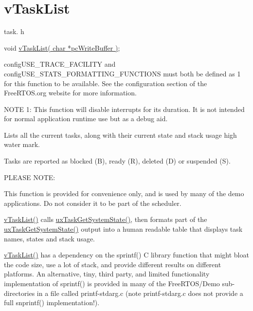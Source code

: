 \hypertarget{group__v_task_list}{}\section{v\+Task\+List}
\label{group__v_task_list}
task. h 
\begin{DoxyPre}void \hyperlink{task_8h_ab87abc717f34ddced76802d12588a93d}{vTaskList( char *pcWriteBuffer )};\end{DoxyPre}


config\+U\+S\+E\+\_\+\+T\+R\+A\+C\+E\+\_\+\+F\+A\+C\+I\+L\+I\+TY and config\+U\+S\+E\+\_\+\+S\+T\+A\+T\+S\+\_\+\+F\+O\+R\+M\+A\+T\+T\+I\+N\+G\+\_\+\+F\+U\+N\+C\+T\+I\+O\+NS must both be defined as 1 for this function to be available. See the configuration section of the Free\+R\+T\+O\+S.\+org website for more information.

N\+O\+TE 1\+: This function will disable interrupts for its duration. It is not intended for normal application runtime use but as a debug aid.

Lists all the current tasks, along with their current state and stack usage high water mark.

Tasks are reported as blocked (\textquotesingle{}B\textquotesingle{}), ready (\textquotesingle{}R\textquotesingle{}), deleted (\textquotesingle{}D\textquotesingle{}) or suspended (\textquotesingle{}S\textquotesingle{}).

P\+L\+E\+A\+SE N\+O\+TE\+:

This function is provided for convenience only, and is used by many of the demo applications. Do not consider it to be part of the scheduler.

\hyperlink{task_8h_ab87abc717f34ddced76802d12588a93d}{v\+Task\+List()} calls \hyperlink{task_8h_aa4603f3de3d809e9beb18d10fbac005d}{ux\+Task\+Get\+System\+State()}, then formats part of the \hyperlink{task_8h_aa4603f3de3d809e9beb18d10fbac005d}{ux\+Task\+Get\+System\+State()} output into a human readable table that displays task names, states and stack usage.

\hyperlink{task_8h_ab87abc717f34ddced76802d12588a93d}{v\+Task\+List()} has a dependency on the sprintf() C library function that might bloat the code size, use a lot of stack, and provide different results on different platforms. An alternative, tiny, third party, and limited functionality implementation of sprintf() is provided in many of the Free\+R\+T\+O\+S/\+Demo sub-\/directories in a file called printf-\/stdarg.\+c (note printf-\/stdarg.\+c does not provide a full snprintf() implementation!).

